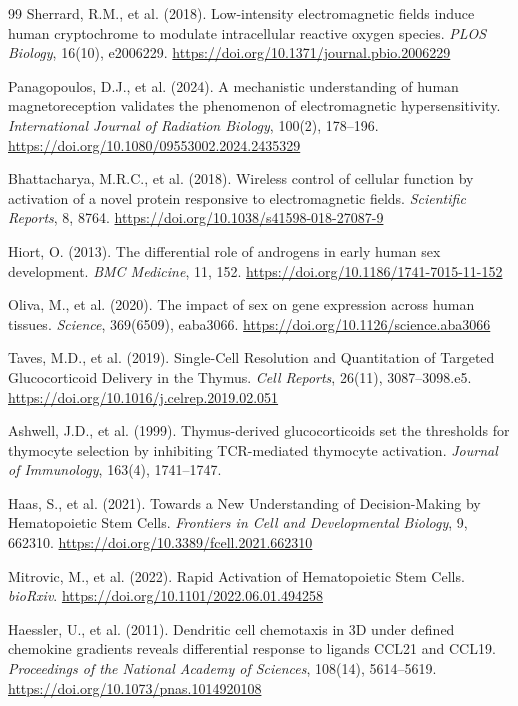 \documentclass[12pt]{article}
\begin{document}
\begin{thebibliography}{99}
Sherrard, R.M., et al. (2018).
Low-intensity electromagnetic fields induce human cryptochrome to modulate intracellular reactive oxygen species.
\textit{PLOS Biology}, 16(10), e2006229.
\url{https://doi.org/10.1371/journal.pbio.2006229}

Panagopoulos, D.J., et al. (2024).
A mechanistic understanding of human magnetoreception validates the phenomenon of electromagnetic hypersensitivity.
\textit{International Journal of Radiation Biology}, 100(2), 178--196.
\url{https://doi.org/10.1080/09553002.2024.2435329}

Bhattacharya, M.R.C., et al. (2018).
Wireless control of cellular function by activation of a novel protein responsive to electromagnetic fields.
\textit{Scientific Reports}, 8, 8764.
\url{https://doi.org/10.1038/s41598-018-27087-9}

Hiort, O. (2013).
The differential role of androgens in early human sex development.
\textit{BMC Medicine}, 11, 152.
\url{https://doi.org/10.1186/1741-7015-11-152}

Oliva, M., et al. (2020).
The impact of sex on gene expression across human tissues.
\textit{Science}, 369(6509), eaba3066.
\url{https://doi.org/10.1126/science.aba3066}

Taves, M.D., et al. (2019).
Single-Cell Resolution and Quantitation of Targeted Glucocorticoid Delivery in the Thymus.
\textit{Cell Reports}, 26(11), 3087--3098.e5.
\url{https://doi.org/10.1016/j.celrep.2019.02.051}

Ashwell, J.D., et al. (1999).
Thymus-derived glucocorticoids set the thresholds for thymocyte selection by inhibiting TCR-mediated thymocyte activation.
\textit{Journal of Immunology}, 163(4), 1741--1747.

Haas, S., et al. (2021).
Towards a New Understanding of Decision-Making by Hematopoietic Stem Cells.
\textit{Frontiers in Cell and Developmental Biology}, 9, 662310.
\url{https://doi.org/10.3389/fcell.2021.662310}

Mitrovic, M., et al. (2022).
Rapid Activation of Hematopoietic Stem Cells.
\textit{bioRxiv}.
\url{https://doi.org/10.1101/2022.06.01.494258}

Haessler, U., et al. (2011).
Dendritic cell chemotaxis in 3D under defined chemokine gradients reveals differential response to ligands CCL21 and CCL19.
\textit{Proceedings of the National Academy of Sciences}, 108(14), 5614--5619.
\url{https://doi.org/10.1073/pnas.1014920108}


\end{thebibliography}
\end{document}
